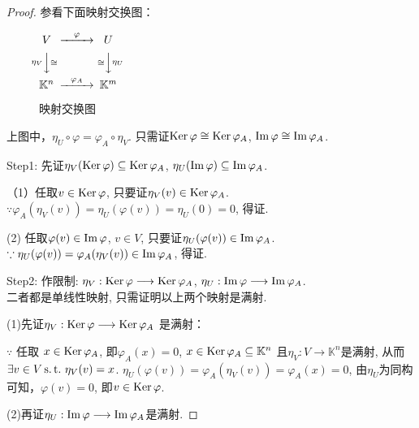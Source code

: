 \begin{proof}
  参看下面映射交换图：%
  \begin{figure}[!ht]\centering
      $\begin{CD}
      V @>{\varphi}>> U \\
      @V{\eta_V}V{\cong}V @V{\cong}V{\eta_U}V\\
      \mathbb{K}^n @>{\varphi_A} >> \mathbb{K}^m
    \end{CD}$
    \caption{映射交换图\label{fig:ImKer1}}
  \end{figure}    
  上图中，$\eta_U\circ\varphi = \varphi_A\circ\eta_V$.
  只需证$ \operatorname{Ker}\varphi \cong \operatorname{Ker}\varphi_A$, $ \operatorname{Im}\varphi \cong \operatorname{Im}\varphi_A $.

  Step1: 先证$ \eta_V(\operatorname{Ker}\varphi) \subseteq \operatorname{Ker}\varphi_A $,
  $ \eta_U(\operatorname{Im}\varphi) \subseteq \operatorname{Im}\varphi_A $.

  （1）任取$ v\in \operatorname{Ker}\varphi$, 只要证$\eta_V(v) \in \operatorname{Ker}\varphi_A$.\\ 
  $ \because \varphi_A(\eta_V(v)) = \eta_U(\varphi(v)) = \eta_U(0) = 0 $, 得证.

  (2) 任取$ \varphi(v) \in \operatorname{Im}\varphi $, $ v \in V $,
  只要证$ \eta_U(\varphi(v)) \in \operatorname{Im}\varphi_A$.\\
  $ \because \eta_U(\varphi(v)) = \varphi_A(\eta_V(v)) \in \operatorname{Im}\varphi_A $, 得证.

  Step2: 作限制:  
  $ \eta_V: \operatorname{Ker}\varphi \longrightarrow \operatorname{Ker}\varphi_A $, 
  $ \eta_U: \operatorname{Im}\varphi \longrightarrow \operatorname{Im}\varphi_A $.\\
  二者都是单线性映射, 只需证明以上两个映射是满射.

  (1)先证$ \eta_V: \operatorname{Ker}\varphi \longrightarrow \operatorname{Ker}\varphi_A $
  是满射：

  $ \because $ 任取 $ x \in \operatorname{Ker}\varphi_A $, 即$ \varphi_A(x) = 0 $,
  $ x \in \operatorname{Ker}\varphi_A \subseteq \mathbb{K}^n $
  且$ \eta_V: V \longrightarrow \mathbb{K}^n $是满射,
  从而$ \exists v \in V \operatorname{s.t.{}} \eta_V(v) = x $.
  $\eta_U(\varphi(v)) = \varphi_A(\eta_V(v)) = \varphi_A(x) = 0 $,
  由$ \eta_U $为同构可知，$\varphi(v) = 0 $, 即$ v \in \operatorname{Ker}\varphi $.

  (2)再证$ \eta_U: \operatorname{Im}\varphi \longrightarrow \operatorname{Im}\varphi_A $是满射.
  

\end{proof}
